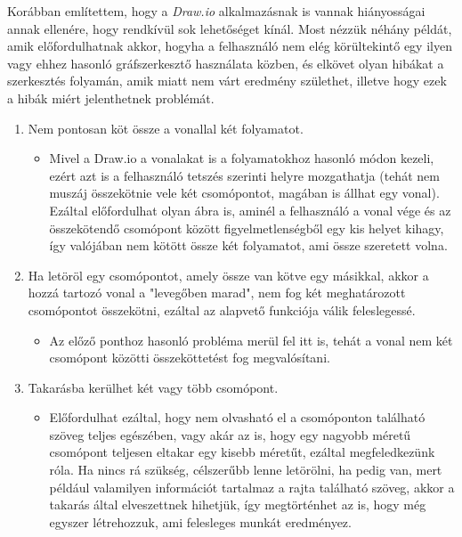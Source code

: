
Korábban említettem, hogy a \textit{Draw.io} alkalmazásnak is vannak hiányosságai annak ellenére, hogy rendkívül sok lehetőséget kínál. Most nézzük néhány példát, amik előfordulhatnak akkor, hogyha a felhasználó nem elég körültekintő egy ilyen vagy ehhez hasonló gráfszerkesztő használata közben, és elkövet olyan hibákat a szerkesztés folyamán, amik miatt nem várt eredmény születhet, illetve hogy ezek a hibák miért jelenthetnek problémát.

\begin{enumerate}
\item Nem pontosan köt össze a vonallal két folyamatot.

\begin{itemize}
\item Mivel a Draw.io a vonalakat is a folyamatokhoz hasonló módon kezeli, ezért azt is a felhasználó tetszés szerinti helyre mozgathatja (tehát nem muszáj összekötnie vele két csomópontot, magában is állhat egy vonal). Ezáltal előfordulhat olyan ábra is, aminél a felhasználó a vonal vége és az összekötendő csomópont között figyelmetlenségből egy kis helyet kihagy, így valójában nem kötött össze két folyamatot, ami össze szeretett volna.
\end{itemize}

\item Ha letöröl egy csomópontot, amely össze van kötve egy másikkal, akkor a hozzá tartozó vonal a "levegőben marad", nem fog két meghatározott csomópontot összekötni, ezáltal az alapvető funkciója válik feleslegessé.

\begin{itemize}
\item Az előző ponthoz hasonló probléma merül fel itt is, tehát a vonal nem két csomópont közötti összeköttetést fog megvalósítani.
\end{itemize}

\item Takarásba kerülhet két vagy több csomópont.

\begin{itemize}
\item Előfordulhat ezáltal, hogy nem olvasható el a csomóponton található szöveg teljes egészében, vagy akár az is, hogy egy nagyobb méretű csomópont teljesen eltakar egy kisebb méretűt, ezáltal megfeledkezünk róla. Ha nincs rá szükség, célszerűbb lenne letörölni, ha pedig van, mert például valamilyen információt tartalmaz a rajta található szöveg, akkor a takarás által elveszettnek hihetjük, így megtörténhet az is, hogy még egyszer létrehozzuk, ami felesleges munkát eredményez.
\end{itemize}


\end{enumerate}
